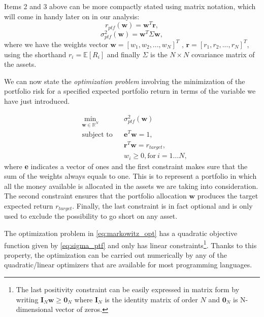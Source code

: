 Items 2 and 3 above can be more compactly stated using matrix notation, which will come in handy later on in our analysis:
\begin{equation}
\label{eq:ptf_return}
r_{ptf}(\mathbf{w}) = \mathbf{w}^T \mathbf{r},
\end{equation}
\begin{equation}
\label{eq:sigma_ptf}
	\sigma^2_{ptf}(\mathbf{w}) =  \mathbf{w}^T \Sigma \mathbf{w},
\end{equation}
\noindent
where we have the weights vector $\mathbf{w} = [w_1, w_2, ... , w_N]^T$ , $\mathbf{r} = [r_1, r_2, ... , r_N]^T$, using the shorthand $r_i = \mathbb{E}[R_i]$ and finally $\Sigma$ is the $N\times N$ covariance matrix of the assets.

\bigskip

We can now state the \textit{optimization problem} involving the minimization of the portfolio risk for a specified expected portfolio return in terms of the variable we have just introduced.

\begin{subequations}
	\label{eq:markowitz_opt}
	\begin{align}
	&\!\min_{\mathbf{w}\in \mathbb{R}^{N}}     &    & \sigma^2_{ptf}(\mathbf{w}) \\
	& \text{subject to}   &   & \mathbf{e}^T\mathbf{w} = 1 ,\\
	&                 &       & \mathbf{r}^T\mathbf{w} = r_{target},\label{eq:constraint2a} \\
	&		   &      & w_{i} \geq 0, \text{for} \: i = 1\dots N,
	\end{align}
\end{subequations}
\noindent
where \textbf{e} indicates a vector of ones and the first constraint makes sure that the sum of the weights always equals to one. This is to represent a portfolio in which all the money available is allocated in the assets we are taking into consideration.
The second constraint ensures that the portfolio allocation $\mathbf{w}$ produces the target expected return $r_{target}$.
Finally, the last constraint is in fact optional and is only used to exclude the possibility to go short on any asset.

The optimization problem in \eqref{eq:markowitz_opt} has a quadratic objective function given by \eqref{eq:sigma_ptf} and only has linear constraints\footnote{The last positivity constraint can be easily expressed in matrix form by writing $ \mathbf{I}_N\mathbf{w} \geq \mathbf{0}_N$ where $\mathbf{I}_N$ is the identity matrix of order $N$ and $\mathbf{0}_N$ is N-dimensional vector of zeros.}. Thanks to this property, the optimization can be carried out numerically by any of the quadratic/linear optimizers that are available for most programming languages.

